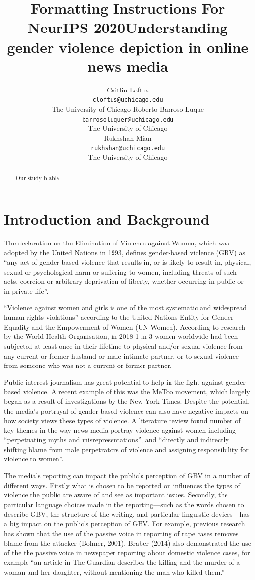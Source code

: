\documentclass{article}
\title{Formatting Instructions For NeurIPS 2020}
\title{Understanding gender violence depiction in online news media}
\author{Caitlin Loftus \\
	\texttt{cloftus@uchicago.edu}  \\
	The University of Chicago
	\AND
	Roberto Barroso-Luque\\
	\texttt{barrosoluquer@uchicago.edu} \\
    The University of Chicago\\
	\AND
	Rukhshan Mian\\
	\texttt{rukhshan@uchicago.edu} \\
	The University of Chicago\\}
\begin{document}
\maketitle

\begin{abstract}{
		Our study blabla
	}
\end{abstract}

\newpage
\section{Introduction and Background}{
	
The declaration on the Elimination of Violence against Women, which was adopted by the United Nations in 1993, defines gender-based violence (GBV) as “any act of gender-based violence that results in, or is likely to result in, physical, sexual or psychological harm or suffering to women, including threats of such acts, coercion or arbitrary deprivation of liberty, whether occurring in public or in private life”. 

“Violence against women and girls is one of the most systematic and widespread human rights violations” according to the United Nations Entity for Gender Equality and the Empowerment of Women (UN Women). According to research by the World Health Organisation, in 2018 1 in 3 women worldwide had been subjected at least once in their lifetime to physical and/or sexual violence from any current or former husband or male intimate partner, or to sexual violence from someone who was not a current or former partner. 

Public  interest  journalism has great potential to help in the fight against  gender-based violence. A recent example of this was the MeToo movement, which largely began as a result of investigations by the New York Times. Despite the potential, the media’s portrayal of gender based violence can also have negative impacts on how society views these types of violence. A literature review found number of key themes in the way news media portray violence against women including “perpetuating myths and misrepresentations”, and “directly and indirectly shifting blame from male perpetrators of violence and assigning responsibility for violence to women”.

The media’s reporting can impact the public’s perception of GBV in a number of different ways. Firstly what is chosen to be reported on influences the types of violence the public are aware of and see as important issues. Secondly, the particular language choices made in the reporting—such as the words chosen to describe GBV, the structure of the writing, and particular linguistic devices—has a big impact on the public’s perception of GBV. For example, previous research has shown that the use of the passive voice in reporting of rape cases removes blame from the attacker (Bohner, 2001). Braber (2014) also demonstrated the use of the the passive voice in newspaper reporting about domestic violence cases, for example “an article in The Guardian describes the killing and the murder of a woman and her daughter, without mentioning the man who killed them.”

}
\end{document}
